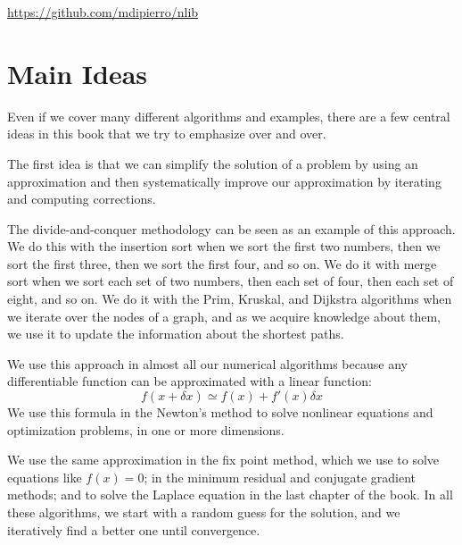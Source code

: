 \documentclass[justified,sixbynine]{tufte-book}
\theoremstyle{plain}%
\theoremstyle{definition}
\theoremstyle{remark}
\begin{document}
\begin{fullwidth}
\url{https://github.com/mdipierro/nlib}

\section{Main Ideas}

Even if we cover many different algorithms and examples, there are a few central ideas in this book that we try to emphasize over and over.

The first idea is that we can simplify the solution of a problem by using an approximation and then systematically improve our approximation by iterating and computing corrections.

The divide-and-conquer methodology can be seen as an example of this approach. We do this with the insertion sort when we sort the first two numbers, then we sort the first three, then we sort the first four, and so on. We do it with merge sort when we sort each set of two numbers, then each set of four, then each set of eight, and so on. We do it with the Prim, Kruskal, and Dijkstra algorithms when we iterate over the nodes of a graph, and as we acquire knowledge about them, we use it to update the information about the shortest paths.

We use this approach in almost all our numerical algorithms because any differentiable function can be approximated with a linear function:
\begin{equation}
f(x+\delta x) \simeq f(x) + f'(x)\delta x
\end{equation}
We use this formula in the Newton's method to solve nonlinear equations and optimization problems, in one or more dimensions.

We use the same approximation in the fix point method, which we use to solve equations like $f(x)=0$; in the minimum residual and conjugate gradient methods; and to solve the Laplace equation in the last chapter of the book. In all these algorithms, we start with a random guess for the solution, and we iteratively find a better one until convergence.


\end{fullwidth}
\end{document}
